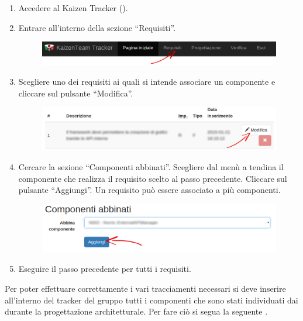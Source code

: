 					\begin{enumerate}
						\item Accedere al Kaizen  Tracker ().
						\item Entrare all'interno della sezione “Requisiti”.
						\begin{figure}[H]
							\centering
							\includegraphics[width=\textwidth]{Pics/HomePageMenuFrecciaReq}
						\end{figure}
						\item Scegliere uno dei requisiti ai quali si intende associare un componente e cliccare sul pulsante “Modifica”.
						\begin{figure}[H]
							\centering
							\includegraphics[width=\textwidth]{Pics/VistaRequisitoFrecciaModifica}
						\end{figure}
						\item Cercare la sezione “Componenti abbinati”. Scegliere dal menù a tendina il componente che realizza il requisito scelto al passo precedente. Cliccare sul pulsante “Aggiungi”. Un requisito  può essere associato a più componenti.
						\begin{figure}[H]
							\centering
							\includegraphics[width=\textwidth]{Pics/AbbianareComponenteRequisito}
						\end{figure}
						\item Eseguire il passo precedente per tutti i requisiti.
					\end{enumerate}
				 \label{sec:InsComponente}
					Per poter effettuare correttamente i vari tracciamenti necessari si deve inserire all'interno del tracker del gruppo tutti i componenti che sono stati individuati dai  durante la progettazione architetturale. Per fare ciò si segua la seguente .
